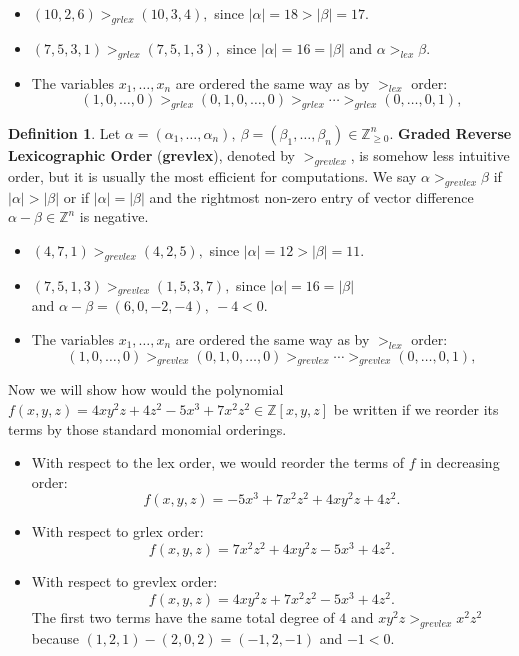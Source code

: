 \documentclass[thesis=M,english]{FITthesis}[2012/10/20]
\theoremstyle{remark}
\theoremstyle{definition}
\newtheorem{DF}{Definition}[section]
\begin{document}
\begin{itemize}
\item $(10,2,6) >_{grlex} (10, 3,4),$ since $|\alpha| = 18 > |\beta| = 17$.
\item $(7,5,3,1) >_{grlex} (7, 5, 1, 3),$ since $|\alpha| = 16 = |\beta|$ and $\alpha >_{lex} \beta$.
\item The variables $x_1,\ldots,x_n$ are ordered the same way as by $>_{lex}$ order:
$$
(1,0,\ldots,0) >_{grlex} (0,1,0,\ldots, 0) >_{grlex} \cdots >_{grlex} (0, \ldots, 0, 1),
$$
\end{itemize} 
\begin{DF}
Let $\alpha = (\alpha_1, \ldots, \alpha_n),\ \beta = (\beta_1, \ldots, \beta_n)\in \mathbb{Z}_{\geq 0}^n.$ \textbf{Graded Reverse Lexicographic Order} (\textbf{grevlex}), denoted by $>_{grevlex}$, is somehow less intuitive order, but it is usually the most efficient for computations.  We say $\alpha >_{grevlex} \beta$ if $|\alpha| > |\beta|$ or if $|\alpha| = |\beta|$ and the rightmost non-zero entry of vector difference $\alpha - \beta \in \mathbb{Z}^n$ is negative.
\end{DF}
\begin{itemize}
\item $(4,7,1) >_{grevlex} (4, 2,5),$ since $|\alpha| = 12 > |\beta| = 11$.
\item $  (7, 5, 1, 3) >_{grevlex} (1,5,3,7),$ since $|\alpha| = 16 = |\beta|$ \\
\phantom{.}\hfill and $\alpha - \beta = (6,0,-2, -4),\ -4 < 0$.
\item The variables $x_1,\ldots,x_n$ are ordered the same way as by $>_{lex}$ order:
$$
(1,0,\ldots,0) >_{grevlex} (0,1,0,\ldots, 0) >_{grevlex} \cdots >_{grevlex} (0, \ldots, 0, 1),
$$
\end{itemize}
Now we will show how would the polynomial $f(x,y,z) = 4xy^2z + 4z^2 - 5x^3 + 7x^2z^2 \in \mathbb{Z}[x,y,z]$ be written if we reorder its terms by those standard monomial orderings.
\begin{itemize}
\item With respect to the lex order, we would reorder the terms of $f$ in decreasing order:
$$
f(x,y,z) = -5x^3 + 7x^2z^2 + 4xy^2z + 4z^2.
$$
\item With respect to grlex order:
$$
f(x,y,z) = 7x^2z^2  + 4xy^2z -5x^3 + 4z^2.
$$
\item With respect to grevlex order:
$$
f(x,y,z) = 4xy^2z + 7x^2z^2  -5x^3 + 4z^2.
$$
The first two terms have the same total degree of $4$ and $xy^2z >_{grevlex} x^2z^2$ because $(1,2,1) - (2,0,2) = (-1,2,-1)$ and $-1 < 0$.
\end{itemize} 
\end{document}
